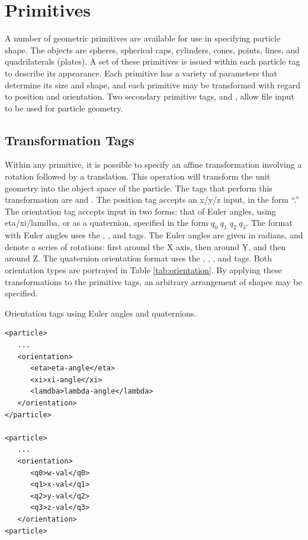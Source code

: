 \section{Primitives}

A number of geometric primitives are available for use in specifying particle shape.
The objects are spheres, spherical caps, cylinders, cones, points, lines, and quadrilaterals (plates).
A set of these primitives is issued within each particle tag to describe its appearance.  Each primitive
has a variety of parameters that determine its size and shape, and each primitive may be transformed with regard to position and orientation.  Two secondary primitive tags,  and , allow file input to be used for particle geometry.

\subsection{Transformation Tags}

Within any primitive, it is possible to specify an affine transformation involving a rotation followed by a translation.  This operation will transform the unit geometry into the object space of the particle.
The tags that perform this transformation are  and .  The position tag accepts an x/y/z input, in the form
``.''
The orientation tag accepts input in two forms: that of Euler angles, using eta/xi/lamdba, or as a quaternion, specified in the form $q_0 \; q_1 \; q_2 \; q_3$.
The format with Euler angles uses the , , and  tags.  The Euler angles are given in radians, and denote a series of rotations: first around the X axis, then around Y, and then around Z.
The quaternion orientation format uses the , , , and  tags.  Both orientation types are portrayed in Table \ref{tab:orientation}.
By applying these transformations to the primitive tags, an arbitrary arrangement of shapes may be specified.

\begin{table}
\caption[Orientation tags using Euler angles and quaternions]{Orientation tags using Euler angles and quaternions.}
\label{tab:orientation}
\begin{verbatim}
<particle>
   ...
   <orientation>
      <eta>eta-angle</eta>
      <xi>xi-angle</xi>
      <lamdba>lambda-angle</lambda>
   </orientation>
</particle>

<particle>
   ...
   <orientation>
      <q0>w-val</q0>
      <q1>x-val</q1>
      <q2>y-val</q2>
      <q3>z-val</q3>
   </orientation>
<particle>
\end{verbatim}
\end{table}


